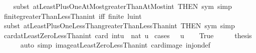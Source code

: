 \begin{isabellebody}
%
\isadelimproof
\ \ %
\endisadelimproof
%
\isatagproof
{}\isamarkupfalse%
\ {\isacharparenleft}{\kern0pt}subst\ atLeastPlusOneAtMost{\isacharunderscore}{\kern0pt}greaterThanAtMost{\isacharunderscore}{\kern0pt}int\ {\isacharbrackleft}{\kern0pt}THEN\ sym{\isacharbrackright}{\kern0pt}{\isacharcomma}{\kern0pt}\ simp{\isacharparenright}{\kern0pt}%
\endisatagproof
{\isafoldproof}%
%
\isadelimproof
\isanewline
%
\endisadelimproof
\isanewline
{}\isamarkupfalse%
\ finite{\isacharunderscore}{\kern0pt}greaterThanLessThan{\isacharunderscore}{\kern0pt}int\ {\isacharbrackleft}{\kern0pt}iff{\isacharbrackright}{\kern0pt}{\isacharcolon}{\kern0pt}\ {\isachardoublequoteopen}finite\ {\isacharbraceleft}{\kern0pt}l{\isacharless}{\kern0pt}{\isachardot}{\kern0pt}{\isachardot}{\kern0pt}{\isacharless}{\kern0pt}u{\isacharcolon}{\kern0pt}{\isacharcolon}{\kern0pt}int{\isacharbraceright}{\kern0pt}{\isachardoublequoteclose}\isanewline
%
\isadelimproof
\ \ %
\endisadelimproof
%
\isatagproof
{}\isamarkupfalse%
\ {\isacharparenleft}{\kern0pt}subst\ atLeastPlusOneLessThan{\isacharunderscore}{\kern0pt}greaterThanLessThan{\isacharunderscore}{\kern0pt}int\ {\isacharbrackleft}{\kern0pt}THEN\ sym{\isacharbrackright}{\kern0pt}{\isacharcomma}{\kern0pt}\ simp{\isacharparenright}{\kern0pt}%
\endisatagproof
{\isafoldproof}%
%
\isadelimproof
%
\endisadelimproof
%
\isadelimdocument
%
\endisadelimdocument
%
\isatagdocument
%
\isamarkuptrue%
%
\endisatagdocument
{\isafolddocument}%
%
\isadelimdocument
%
\endisadelimdocument
{}\isamarkupfalse%
\ card{\isacharunderscore}{\kern0pt}atLeastZeroLessThan{\isacharunderscore}{\kern0pt}int{\isacharcolon}{\kern0pt}\ {\isachardoublequoteopen}card\ {\isacharbraceleft}{\kern0pt}{\isacharparenleft}{\kern0pt}{}{\isacharcolon}{\kern0pt}{\isacharcolon}{\kern0pt}int{\isacharparenright}{\kern0pt}{\isachardot}{\kern0pt}{\isachardot}{\kern0pt}{\isacharless}{\kern0pt}u{\isacharbraceright}{\kern0pt}\ {\isacharequal}{\kern0pt}\ nat\ u{\isachardoublequoteclose}\isanewline
%
\isadelimproof
%
\endisadelimproof
%
\isatagproof
{}\isamarkupfalse%
\ {\isacharparenleft}{\kern0pt}cases\ {\isachardoublequoteopen}{}\ {\isasymle}\ u{\isachardoublequoteclose}{\isacharparenright}{\kern0pt}\isanewline
\ \ \isamarkupfalse%
\ True\isanewline
\ \ \isamarkupfalse%
\ \isamarkupfalse%
\ {\isacharquery}{\kern0pt}thesis\isanewline
\ \ \ \ \isamarkupfalse%
\ {\isacharparenleft}{\kern0pt}auto\ simp{\isacharcolon}{\kern0pt}\ image{\isacharunderscore}{\kern0pt}atLeastZeroLessThan{\isacharunderscore}{\kern0pt}int\ card{\isacharunderscore}{\kern0pt}image\ inj{\isacharunderscore}{\kern0pt}on{\isacharunderscore}{\kern0pt}def{\isacharparenright}{\kern0pt}\ \ \ \ \isanewline

\end{isabellebody}
